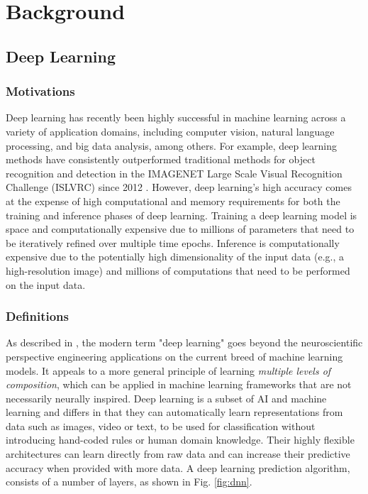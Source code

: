 \chapter{Background} \label{chap:background}

\section{Deep Learning} \label{sec:deeplearning}
\subsection{Motivations}
Deep learning has recently been highly successful in machine learning across a variety of application domains, including computer vision, natural language processing, and big data analysis, among others. For example, deep learning methods have consistently outperformed traditional methods for object recognition and detection in the IMAGENET Large Scale Visual Recognition Challenge (ISLVRC) since 2012 \cite{ILSVRC15}.
However, deep learning's high accuracy comes at the expense of high computational and memory requirements for both the training and inference phases of deep learning. Training a deep learning model is space and computationally expensive due to millions of parameters that need to be iteratively refined over multiple time epochs. Inference is computationally expensive due to the potentially high dimensionality of the input data (e.g., a high-resolution image) and millions of computations that need to be performed on the input data.

\subsection{Definitions}
As described in \cite{Goodfellow-et-al-2016}, the modern term "deep learning" goes beyond the neuroscientific perspective engineering applications on the current breed of machine learning models. It appeals to a more general principle of learning \textit{multiple levels of composition}, which can be applied in machine learning frameworks that are not necessarily neurally inspired. Deep learning is a subset of AI and machine learning and differs in that they can automatically learn representations from data such as images, video or text, to be used for classification without introducing hand-coded rules or human domain knowledge. Their highly flexible architectures can learn directly from raw data and can increase their predictive accuracy when provided with more data.
A deep learning prediction algorithm, consists of a number of layers, as shown in Fig. \ref{fig:dnn}.

